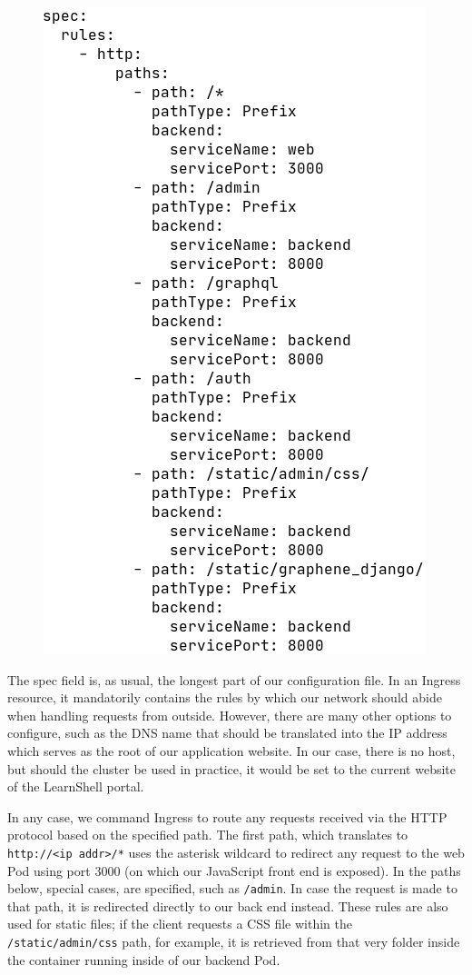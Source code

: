 \documentclass[thesis=B,english]{FITthesis}[2019/12/23]
\begin{document}
\begin{figure}[H]
\centering
\hspace*{0.7cm}
\includegraphics[scale=0.5]{kube-ingress2}
\end{figure}

The spec field is, as usual, the longest part of our configuration file. In an Ingress resource, it mandatorily contains the rules by which our network should abide when handling requests from outside. However, there are many other options to configure, such as the DNS name that should be translated into the IP address which serves as the root of our application website. In our case, there is no host, but should the cluster be used in practice, it would be set to the current website of the LearnShell portal.

In any case, we command Ingress to route any requests received via the HTTP protocol based on the specified path. The first path, which translates to \verb|http://<ip addr>/*| uses the asterisk wildcard to redirect any request to the web Pod using port 3000 (on which our JavaScript front end is exposed). In the paths below, special cases, are specified, such as \verb|/admin|. In case the request is made to that path, it is redirected directly to our back end instead. These rules are also used for static files; if the client requests a CSS file within the \verb|/static/admin/css| path, for example, it is retrieved from that very folder inside the container running inside of our backend Pod.
\end{document}
